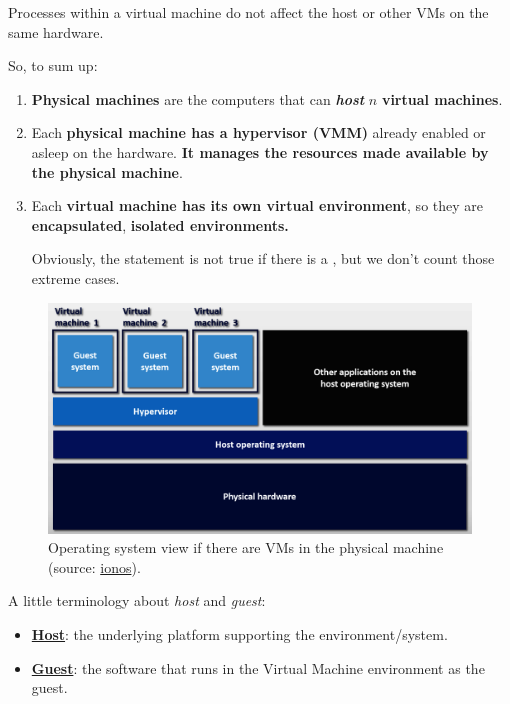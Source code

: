 \highspace
Processes within a virtual machine do not affect the host or other VMs on the same hardware.

\highspace
So, to sum up:
\begin{enumerate}
    \item \textbf{Physical machines} are the computers that can \textbf{\emph{host}} $n$ \textbf{virtual machines}.
    
    \item Each \textbf{physical machine has a hypervisor (VMM)} already enabled or asleep on the hardware. \textbf{It manages the resources made available by the physical machine}.
    
    \item Each \textbf{virtual machine has its own virtual environment}, so they are \textbf{encapsulated}, \textbf{isolated environments.} 
    
    Obviously, the statement is not true if there is a , but we don't count those extreme cases.\cite{wu2017access}
\end{enumerate}

\newpage

\begin{figure}[!htp]
    \centering
    \includegraphics[width=\textwidth]{img/vm-1.png}
    \caption{Operating system view if there are VMs in the physical machine (source: \href{https://www.ionos.co.uk/digitalguide/server/know-how/virtual-machines/}{ionos}).}
\end{figure}

\noindent
A little terminology about \emph{host} and \emph{guest}:
\begin{itemize}
    \item \textbf{\underline{Host}}: the underlying platform supporting the environment/system.
    \item \textbf{\underline{Guest}}: the software that runs in the Virtual Machine environment as the guest.
\end{itemize}

